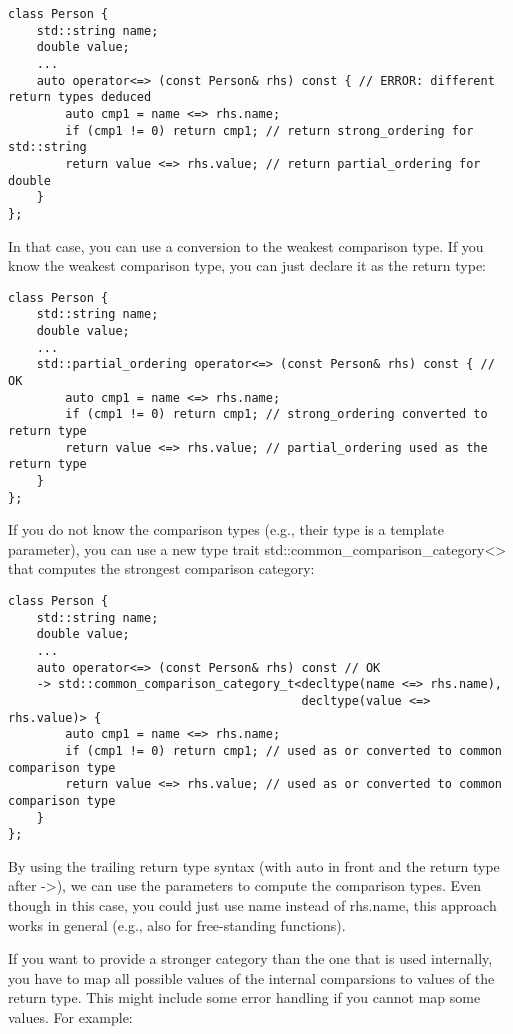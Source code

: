 \begin{lstlisting}[style=styleCXX]
class Person {
	std::string name;
	double value;
	...
	auto operator<=> (const Person& rhs) const { // ERROR: different return types deduced
		auto cmp1 = name <=> rhs.name;
		if (cmp1 != 0) return cmp1; // return strong_ordering for std::string
		return value <=> rhs.value; // return partial_ordering for double
	}
};
\end{lstlisting}

In that case, you can use a conversion to the weakest comparison type. If you know the weakest comparison type, you can just declare it as the return type:

\begin{lstlisting}[style=styleCXX]
class Person {
	std::string name;
	double value;
	...
	std::partial_ordering operator<=> (const Person& rhs) const { // OK
		auto cmp1 = name <=> rhs.name;
		if (cmp1 != 0) return cmp1; // strong_ordering converted to return type
		return value <=> rhs.value; // partial_ordering used as the return type
	}
};
\end{lstlisting}

If you do not know the comparison types (e.g., their type is a template parameter), you can use a new type trait std::common\_comparison\_category<> that computes the strongest comparison category:

\begin{lstlisting}[style=styleCXX]
class Person {
	std::string name;
	double value;
	...
	auto operator<=> (const Person& rhs) const // OK
	-> std::common_comparison_category_t<decltype(name <=> rhs.name),
										 decltype(value <=> rhs.value)> {
		auto cmp1 = name <=> rhs.name;
		if (cmp1 != 0) return cmp1; // used as or converted to common comparison type
		return value <=> rhs.value; // used as or converted to common comparison type
	}
};
\end{lstlisting}

By using the trailing return type syntax (with auto in front and the return type after ->), we can use the parameters to compute the comparison types. Even though in this case, you could just use name instead of rhs.name, this approach works in general (e.g., also for free-standing functions).

If you want to provide a stronger category than the one that is used internally, you have to map all possible values of the internal comparsions to values of the return type. This might include some error handling if you cannot map some values. For example:

